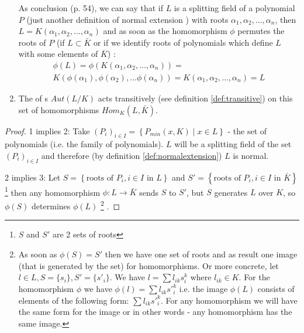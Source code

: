\begin{theorem}
\begin{enumerate}
{      As conclusion
      \cite{bib:baker} (p. 54),
      we can say that if $L$ is a splitting field of a
      polynomial $P$ (just another definition of normal extension
      \cite{bib:baker}) 
      with roots $\alpha_1, \alpha_2, \dots, \alpha_n$,  then
      $L=K\left(\alpha_1, \alpha_2, \dots, \alpha_n\right)$ and as
      soon as the homomorphism $\phi$ permutes the roots of $P$
      (if $L \subset \bar{K}$ or if we
      identify roots of polynomials which define $L$ with some
      elements of $\overline{K}$)
      :
      \begin{eqnarray}
      \phi\left(L\right) =
      \phi\left(K\left(\alpha_1, \alpha_2, \dots,
      \alpha_n\right)\right) =
      \nonumber \\
      K \left(\phi\left(\alpha_1\right),
      \phi\left(\alpha_2\right),
      \dots
      \phi\left(\alpha_n\right)
      \right) =
      K\left(\alpha_1, \alpha_2, \dots, \alpha_n\right) = L
      \nonumber
      \end{eqnarray}
    }
  \item The  of s
    $Aut\left(L/K\right)$ acts transitively (see definition
    \ref{def:transitive}) on this set of 
    homomorphisms $Hom_K\left(L, \bar{K}\right)$.
  \end{enumerate}
  \label{thm:lec5_3}
  \begin{proof}
    1 implies 2: Take
    $\left(P_i\right)_{i \in I} = \left\{P_{min}\left(x, K\right) \mid
    x \in L\right\}$ - the set of polynomials
    (i.e. the family of polynomials).
    $L$ will be a splitting field of the set $\left(P_i\right)_{i \in
      I}$ and therefore (by definition \ref{def:normalextension}) $L$ is normal.

    2 implies 3: Let
    $S = \left\{\mbox{roots of } P_i, i \in I \mbox{ in } L\right\}$
    and
    $S' = \left\{\mbox{roots of } P_i, i \in I \mbox{ in }
    \bar{K}\right\}$
    \footnote{
      $S$ and $S'$ are 2 sets of roots
    }
    then any homomorphism
    $\phi: L \to \bar{K}$ sends $S$ to $S'$, but $S$ generates $L$
    over $K$, so $\phi\left(S\right)$ determines $\phi\left(L\right)$
    \footnote{
      As soon as $\phi(S) = S'$ then we have one set of roots and as
      result one image (that is generated by the set) for
      homomorphisms. Or more concrete, let $l \in L, S = \{s_i\}, S' =
      \{s'_i\}$. We have $l = \sum l_{ik}s_i^k$ where $l_{ik} \in K$.
      For the homomorphism $\phi$ we have
      $\phi(l) = \sum l_{ik}{s'}_i^k$ i.e. the image $\phi(L)$ consists
      of elements of the following form: $\sum l_{ik}{s'}_i^k$. For any
      homomorphism we will have the same form for the image or in
      other words - any homomorphism has the same image.
    }
    .


\end{proof}
\end{theorem}
